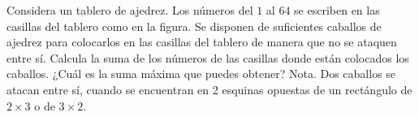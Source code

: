 Considera un tablero de ajedrez. Los números del $1$ al $64$ se escriben en las casillas del
tablero como en la figura. Se disponen de suficientes caballos de ajedrez para colocarlos en las casillas del tablero de
manera que no se ataquen entre sí. Calcula la suma de los números de las casillas donde
están colocados los caballos. ¿Cuál es la suma máxima que puedes obtener? Nota. Dos
caballos se atacan entre sí, cuando se encuentran en 2 esquinas opuestas de un rectángulo
de $2\times 3$ o de $3 \times 2$.